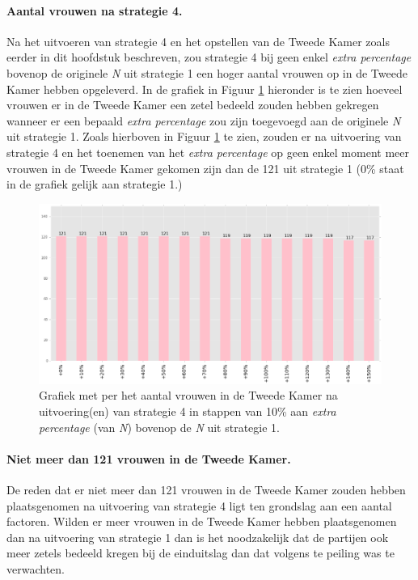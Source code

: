 \paragraph{Aantal vrouwen na strategie 4.}
Na het uitvoeren van strategie 4 en het opstellen van de Tweede Kamer zoals eerder in dit hoofdstuk beschreven, zou strategie 4 bij geen enkel \textit{extra percentage} bovenop de originele \textit{N} uit strategie 1 een hoger aantal vrouwen op in de Tweede Kamer hebben opgeleverd. In de grafiek in Figuur \ref{fig:bcS4V} hieronder is te zien hoeveel vrouwen er in de Tweede Kamer een zetel bedeeld zouden hebben gekregen wanneer er een bepaald \textit{extra percentage} zou zijn toegevoegd aan de originele \textit{N} uit strategie 1. Zoals hierboven in Figuur \ref{fig:bcS4V} te zien, zouden er na uitvoering van strategie 4 en het toenemen van het \textit{extra percentage} op geen enkel moment meer vrouwen in de Tweede Kamer gekomen zijn dan de 121 uit strategie 1 (0\% staat in de grafiek gelijk aan strategie 1.) 


\begin{figure}[H]

	\includegraphics[width=\linewidth]	{topNextrapercentage_aantal_vrouwen_overzicht.png}

			\caption{Grafiek met per het aantal vrouwen in de Tweede Kamer na uitvoering(en) van strategie 4 in stappen van 10\% aan \textit{extra percentage} (van \textit{N}) bovenop de \textit{N} uit strategie 1.}

\label{fig:bcS4V}
\end{figure}





\paragraph{Niet meer dan 121 vrouwen in de Tweede Kamer.}
De reden dat er niet meer dan 121 vrouwen in de Tweede Kamer zouden hebben plaatsgenomen na uitvoering van strategie 4 ligt ten grondslag aan een aantal factoren. Wilden er meer vrouwen in de Tweede Kamer hebben plaatsgenomen dan na uitvoering van strategie 1 dan is het noodzakelijk dat de partijen ook meer zetels bedeeld kregen bij de einduitslag dan dat volgens te peiling was te verwachten. 

